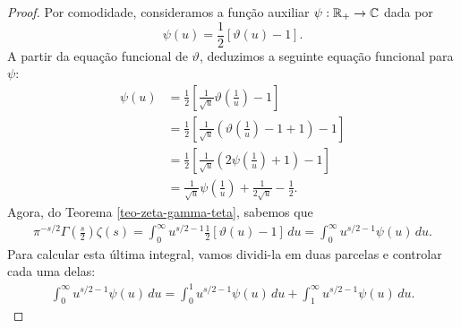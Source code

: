     \begin{proof}
        Por comodidade, consideramos a função auxiliar $\psi:\mathbb{R}_+\to\mathbb{C}$ dada por
        \[
        \psi(u) = \frac{1}{2}[\vartheta(u) - 1].
        \]
        A partir da equação funcional de $\vartheta$, deduzimos a seguinte equação funcional
        para $\psi$:
        \begin{align*}
            \psi(u) &= \frac{1}{2}\left[\frac{1}{\sqrt{u}}\vartheta\left( \frac{1}{u} \right) - 1\right] \\
                    &= \frac{1}{2}\left[\frac{1}{\sqrt{u}}
                    \left( \vartheta\left( \frac{1}{u} \right) - 1 + 1 \right) - 1\right] \\
                    &= \frac{1}{2}\left[\frac{1}{\sqrt{u}}
                    \left( 2\psi\left( \frac{1}{u} \right) + 1 \right) - 1\right] \\
                    &= \frac{1}{\sqrt{u}}\psi\left( \frac{1}{u} \right) + \frac{1}{2\sqrt{u}} - \frac{1}{2}.
        \end{align*}
        Agora, do Teorema \ref{teo-zeta-gamma-teta}, sabemos que
        \begin{align*}
            \pi^{-s/2}\Gamma\left( \frac{s}{2} \right)\zeta(s) 
            = \int_0^{\infty} u^{s/2 - 1}\frac{1}{2}[\vartheta(u) - 1] \, du
            = \int_0^{\infty} u^{s/2 - 1}\psi(u) \, du.
        \end{align*}
        Para calcular esta última integral, vamos dividi-la em duas parcelas e controlar
        cada uma delas:
        \begin{align}
        \label{eq-aux1-teo-eq-func-zeta-completa}
        \int_0^{\infty} u^{s/2 - 1}\psi(u) \, du
        = \int_0^1 u^{s/2 - 1}\psi(u) \, du + \int_1^{\infty} u^{s/2 - 1}\psi(u) \, du.
        \end{align}
        

\end{proof}
